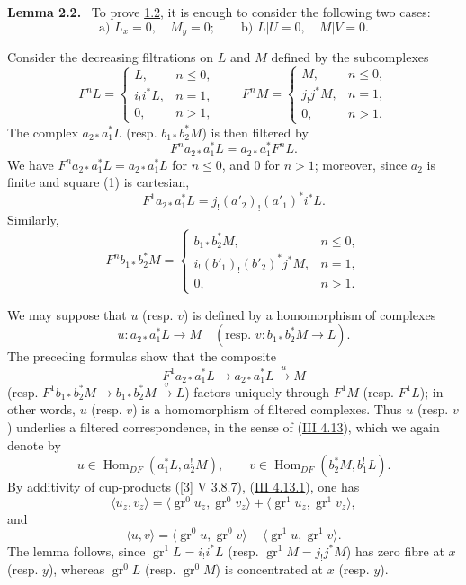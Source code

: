 \documentclass[11pt]{article}
\newenvironment{statement}[1]{\par\medskip\noindent\textbf{#1.}\ }{\par\medskip}
\DeclareMathOperator{\Hom}{Hom}
\providecommand{\Hom}{\operatorname{Hom}}
\providecommand{\Hom}{\operatorname{Hom}}
\begin{document}
\label{sga5:IIIB:lemma:2.2}\begin{statement}{Lemma 2.2}
To prove \hyperref[sga5:IIIB:theorem:1.2]{1.2}, it is enough to consider the following two cases:
\[
\text{a) } L_x=0,\quad M_y=0;\qquad
\text{b) } L|U=0,\quad M|V=0 .
\]
\end{statement}

Consider the decreasing filtrations on $L$ and $M$ defined by the subcomplexes
\[
F^nL=
\begin{cases}
L,& n\le 0,\\
i_!i^*L,& n=1,\\
0,& n>1,
\end{cases}
\qquad
F^nM=
\begin{cases}
M,& n\le 0,\\
j_!j^*M,& n=1,\\
0,& n>1.
\end{cases}
\]
The complex $a_{2*}a_1^*L$ (resp. $b_{1*}b_2^*M$) is then filtered by
\[
F^n a_{2*}a_1^*L=a_{2*}a_1^*F^nL.
\]
We have $F^n a_{2*}a_1^*L=a_{2*}a_1^*L$ for $n\le0$, and $0$ for $n>1$; moreover, since $a_2$ is finite and square (1) is cartesian,
\[
F^1a_{2*}a_1^*L=j_!(a'_2)_!(a'_1)^*i^*L.
\]
Similarly,
\[
F^n b_{1*}b_2^*M=
\begin{cases}
b_{1*}b_2^*M,& n\le 0,\\
i_!(b'_1)_!(b'_2)^*j^*M,& n=1,\\
0,& n>1.
\end{cases}
\]

We may suppose that $u$ (resp. $v$) is defined by a homomorphism of complexes
\[
u:a_{2*}a_1^*L\longrightarrow M
\quad
(\text{resp. }v:b_{1*}b_2^*M\longrightarrow L).
\]
The preceding formulas show that the composite
\[
F^1a_{2*}a_1^*L\longrightarrow a_{2*}a_1^*L\xrightarrow{u}M
\]
(resp. $F^1b_{1*}b_2^*M\to b_{1*}b_2^*M\xrightarrow{v}L$) factors uniquely through $F^1M$ (resp. $F^1L$); in other words, $u$ (resp. $v$) is a homomorphism of filtered complexes. Thus $u$ (resp. $v$) underlies a filtered correspondence, in the sense of (\hyperref[sga5:III:statement:4.13]{III 4.13}), which we again denote by
\[
u\in\Hom_{DF}(a_1^*L,a_2^!M),\qquad
v\in\Hom_{DF}(b_2^*M,b_1^!L).
\]
By additivity of cup-products ([3] V 3.8.7), (\hyperref[sga5:III:equation:4.13.1]{III 4.13.1}), one has
\[
\langle u_z,v_z\rangle
 =\langle \operatorname{gr}^0u_z,\operatorname{gr}^0v_z\rangle
 +\langle \operatorname{gr}^1u_z,\operatorname{gr}^1v_z\rangle,
\]
and
\[
\langle u,v\rangle
 =\langle \operatorname{gr}^0u,\operatorname{gr}^0v\rangle
 +\langle \operatorname{gr}^1u,\operatorname{gr}^1v\rangle.
\]
The lemma follows, since $\operatorname{gr}^1L=i_!i^*L$ (resp. $\operatorname{gr}^1M=j_!j^*M$) has zero fibre at $x$ (resp. $y$), whereas $\operatorname{gr}^0L$ (resp. $\operatorname{gr}^0M$) is concentrated at $x$ (resp. $y$).
\end{document}
